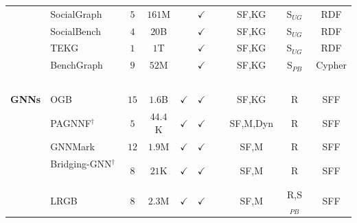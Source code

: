 \begin{landscape}
\begin{table}[htbp]
\begin{tabular}{ll|cccccccc}
               {\footnotesize ~              }  & {\footnotesize SocialGraph~\cite{Angles2013}           }      &  $5$      &    $161$M    &               & $\checkmark$  &               & SF,KG         & S$_{UG}$      &  RDF          \\
               {\footnotesize ~              }  & {\footnotesize SocialBench~\cite{Erling2015}           }      &  $4$      & $20$B        &               & $\checkmark$  &               & SF,KG         & S$_{UG}$      &  RDF          \\
               {\footnotesize ~              }  & {\footnotesize TEKG~\cite{Mcnight2021}           }            &  $1$      & $1$T         &               & $\checkmark$  &               & SF,KG         & S$_{UG}$      &  RDF          \\
               {\footnotesize ~              }  & {\footnotesize BenchGraph~\cite{Javor2022,Javor2023}   }      &  $9$      & $52$M        &               & $\checkmark$  &               & SF,KG         & S$_{PB}$      &  Cypher       \\
               {\footnotesize ~              }  & {\footnotesize ~                                       }      &   ~       &       ~      &       ~       &       ~       &       ~       &       ~       &       ~       &      ~        \\
               {\footnotesize \textbf{GNNs}  }  & {\footnotesize OGB~\cite{Hu2020}                       }      &  $15$     &  $1.6$B      & $\checkmark$  & $\checkmark$  &               & SF,KG         & R             & SFF           \\
               {\footnotesize ~              }  & {\footnotesize PAGNNF${^\dagger}$~\cite{Wu2021a}          }   &  $5$      &  $44.4$K     & $\checkmark$  & $\checkmark$  &               & SF,M,Dyn      & R             & SFF           \\
               {\footnotesize ~              }  & {\footnotesize GNNMark~\cite{Baruah2021}               }      &  $12$     &  $1.9$M      & $\checkmark$  & $\checkmark$  &               & SF,M          & R             & SFF           \\
               {\footnotesize ~              }  & {\footnotesize Bridging-GNN$^{\dagger}$~\cite{Huang2021}  }   &  $8$      &  $21$K       & $\checkmark$  & $\checkmark$  &               & SF,M          & R             & SFF           \\
               {\footnotesize ~              }  & {\footnotesize LRGB~\cite{Dwivedi2022}                 }      &  $8$      &  $2.3$M      & $\checkmark$  & $\checkmark$  &               & SF,M          & R,S$_{PB}$    & SFF           \\

\end{tabular}
\end{table}
\end{landscape}

